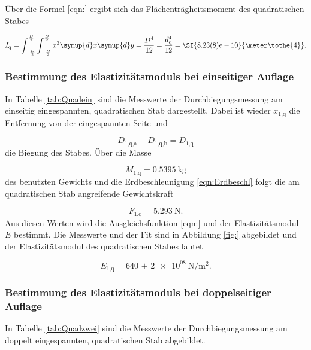 Über die Formel \eqref{eqn:} ergibt sich das Flächenträgheitsmoment des
quadratischen Stabes

\begin{equation}
  I_\text{q} = \int_{-\frac{D}{2}}^{\frac{D}{2}}
  \int_{-\frac{D}{2}}^{\frac{D}{2}} x^2 \symup{d}x \symup{d}y = \frac{D^4}{12} =
  \frac{d_\text{q}^4}{12} = \SI{8.23(8)e-10}{\meter\tothe{4}}.
\end{equation}

\subsubsection{Bestimmung des Elastizitätsmoduls bei einseitiger Auflage}

In Tabelle \ref{tab:Quadein} sind die Messwerte der Durchbiegungsmessung am
einseitig eingespannten, quadratischen Stab dargestellt.
Dabei ist wieder $x_\text{1,q}$ die Entfernung von der eingespannten Seite
und

\begin{equation}
  D_\text{1,q,a} - D_\text{1,q,b} = D_\text{1,q}
\end{equation}
die Biegung des Stabes. Über die Masse

\begin{equation}
  M_\text{1,q} =  \SI{0.5395}{\kilo\gram}
\end{equation}
des benutzten Gewichts
und die Erdbeschleunigung \eqref{eqn:Erdbeschl}
folgt die am quadratischen Stab angreifende Gewichtskraft

\begin{equation}
  F_\text{1,q} = \SI{5.293}{\newton}.
\end{equation}
Aus diesen Werten wird die Ausgleichsfunktion \eqref{eqn:} und der
Elastizitätsmodul $E$ bestimmt. Die Messwerte und der Fit sind in Abbildung
\ref{fig:} abgebildet und der Elastizitätsmodul des quadratischen Stabes lautet

\begin{equation}
  E_\text{1,q} = \SI{640(2)e08}{\newton\per\meter\squared}.
\end{equation}

\subsubsection{Bestimmung des Elastizitätsmoduls bei doppelseitiger Auflage}

In Tabelle \ref{tab:Quadzwei} sind die Messwerte der Durchbiegungsmessung am
doppelt eingespannten, quadratischen Stab abgebildet.

